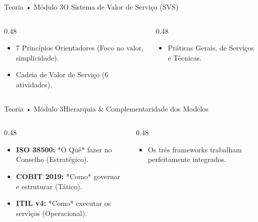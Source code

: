 \begin{senaiframe}{Teoria • Módulo 3}{O Sistema de Valor de Serviço (SVS)}
  \begin{columns}[t]
    \begin{column}{0.48\textwidth}
      \begin{tcolorbox}[senaibluecard, title={Componentes do SVS}]
        \begin{itemize}
          \item 7 Princípios Orientadores (Foco no valor, simplicidade).
          \item Cadeia de Valor de Serviço (6 atividades).
        \end{itemize}
      \end{tcolorbox}
    \end{column}
    \begin{column}{0.48\textwidth}
      \begin{tcolorbox}[senaigreencard, title={34 Práticas de Gestão}]
        \begin{itemize}
          \item Práticas Gerais, de Serviços e Técnicas.
        \end{itemize}
      \end{tcolorbox}
    \end{column}
  \end{columns}
\end{senaiframe}

\begin{senaiframe}{Teoria • Módulo 3}{Hierarquia \& Complementaridade dos Modelos}
  \begin{columns}[t]
    \begin{column}{0.48\textwidth}
      \begin{tcolorbox}[senaibluecard, title={Níveis de Abstração}]
        \begin{itemize}
          \item \textbf{ISO 38500:} *O Quê* fazer no Conselho (Estratégico).
          \item \textbf{COBIT 2019:} *Como* governar e estruturar (Tático).
          \item \textbf{ITIL v4:} *Como* executar os serviços (Operacional).
        \end{itemize}
      \end{tcolorbox}
    \end{column}
    \begin{column}{0.48\textwidth}
      \begin{tcolorbox}[senaigreencard, title={Uso Conjunto}]
        \begin{itemize}
          \item Os três frameworks trabalham perfeitamente integrados.
        \end{itemize}
      \end{tcolorbox}
    \end{column}
  \end{columns}
\end{senaiframe}

